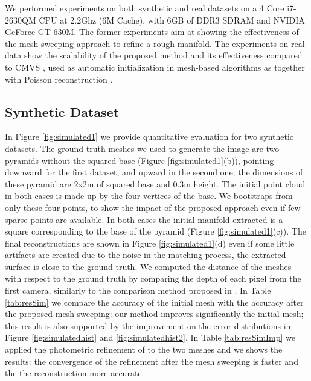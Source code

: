 We performed experiments on both synthetic and real datasets on a 4 Core i7-2630QM CPU at 2.2Ghz (6M Cache), with 6GB of DDR3 SDRAM and NVIDIA GeForce GT 630M. The former experiments aim at showing the effectiveness of the mesh sweeping approach to refine a rough manifold.
The experiments on real data show the scalability of the proposed method and its effectiveness compared to CMVS \cite{fu10}, used as automatic initialization in mesh-based algorithms as \cite{pan2015automatic,li2015detail} together with Poisson reconstruction \cite{kazhdan2006poisson}. 

\subsection{Synthetic Dataset}
In Figure \ref{fig:simulated1} we provide quantitative evaluation for two synthetic datasets.
The ground-truth meshes we used to generate the image are two pyramids without the squared base (Figure \ref{fig:simulated1}(b)), pointing downward for the first dataset, and upward in the second one; the dimensions of these pyramid are 2x2m of squared base and 0.3m height.
The initial point cloud in both cases is made up by the four vertices of the base. 
We bootstraps from only these four points, to show the impact of the proposed approach even if few sparse points are available.
In both cases the initial manifold extracted is a square corresponding to the base of the pyramid (Figure \ref{fig:simulated1}(c)).
The final reconstructions are shown in Figure \ref{fig:simulated1}(d) even if some little artifacts are created due to the noise in the matching process, the extracted surface is close to the ground-truth.
We computed the distance of the meshes with respect to the ground truth by comparing the depth of each pixel from the first camera, similarly to the comparison method proposed in \cite{strecha2008}. 
In Table \ref{tab:resSim} we compare the accuracy of the initial mesh with the accuracy after the proposed mesh sweeping: our method improves significantly the initial mesh; this result is also supported by the improvement on the error distributions in  Figure \ref{fig:simulatedhist} and \ref{fig:simulatedhist2}.
In Table \ref{tab:resSimImp} we applied the photometric refinement of \cite{vu_et_al_2012} to the two meshes and we shows the results: the convergence of the refinement after the mesh sweeping is faster and the the reconstruction more accurate.


